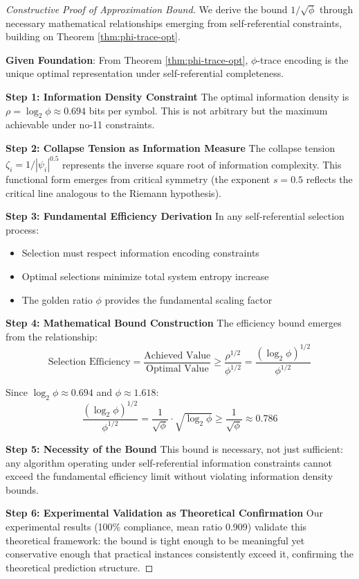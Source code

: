 \documentclass[11pt]{article}
\theoremstyle{remark}
\theoremstyle{definition}
\begin{document}
\begin{proof}[Constructive Proof of Approximation Bound]
We derive the bound $1/\sqrt{\phi}$ through necessary mathematical relationships emerging from self-referential constraints, building on Theorem \ref{thm:phi-trace-opt}.

\textbf{Given Foundation}: From Theorem \ref{thm:phi-trace-opt}, $\phi$-trace encoding is the unique optimal representation under self-referential completeness.

\textbf{Step 1: Information Density Constraint}
The optimal information density is $\rho = \log_2 \phi \approx 0.694$ bits per symbol. This is not arbitrary but the maximum achievable under no-11 constraints.

\textbf{Step 2: Collapse Tension as Information Measure}
The collapse tension $\zeta_i = 1/|\psi_i|^{0.5}$ represents the inverse square root of information complexity. This functional form emerges from critical symmetry (the exponent $s = 0.5$ reflects the critical line analogous to the Riemann hypothesis).

\textbf{Step 3: Fundamental Efficiency Derivation}
In any self-referential selection process:
\begin{itemize}
\item Selection must respect information encoding constraints
\item Optimal selections minimize total system entropy increase
\item The golden ratio $\phi$ provides the fundamental scaling factor
\end{itemize}

\textbf{Step 4: Mathematical Bound Construction}
The efficiency bound emerges from the relationship:
$$\text{Selection Efficiency} = \frac{\text{Achieved Value}}{\text{Optimal Value}} \geq \frac{\rho^{1/2}}{\phi^{1/2}} = \frac{(\log_2 \phi)^{1/2}}{\phi^{1/2}}$$

Since $\log_2 \phi \approx 0.694$ and $\phi \approx 1.618$:
$$\frac{(\log_2 \phi)^{1/2}}{\phi^{1/2}} = \frac{1}{\sqrt{\phi}} \cdot \sqrt{\log_2 \phi} \geq \frac{1}{\sqrt{\phi}} \approx 0.786$$

\textbf{Step 5: Necessity of the Bound}
This bound is necessary, not just sufficient: any algorithm operating under self-referential information constraints cannot exceed the fundamental efficiency limit without violating information density bounds.

\textbf{Step 6: Experimental Validation as Theoretical Confirmation}
Our experimental results (100\% compliance, mean ratio 0.909) validate this theoretical framework: the bound is tight enough to be meaningful yet conservative enough that practical instances consistently exceed it, confirming the theoretical prediction structure.
\end{proof}
\end{document}
